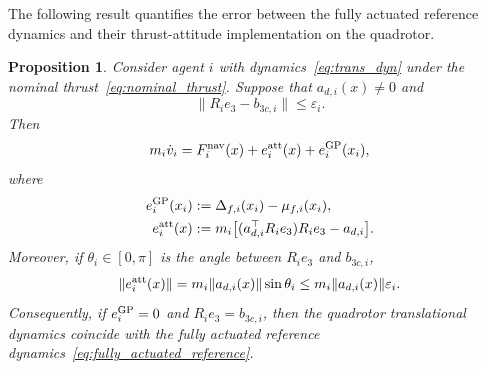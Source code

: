 \documentclass[journal,twoside,web]{ieeecolor}
\newtheorem{proposition}[theorem]{Proposition}
\newtheorem{remark}[theorem]{Remark}
\begin{document}
The following result quantifies the error between the
fully actuated reference dynamics and their thrust-attitude
implementation on the quadrotor.

\begin{proposition}
\label{prop:implementation_error}
Consider agent $i$ with dynamics~\eqref{eq:trans_dyn}
under the nominal thrust~\eqref{eq:nominal_thrust}. Suppose
that $a_{d,i}(x)\neq0$ and
\begin{equation}
    \|R_ie_3-b_{3c,i}\|\leq\varepsilon_i .
    \label{eq:thrust_direction_error}
\end{equation}
Then
\begin{equation}
    m_i\dot v_i
    =
    F_i^{\rm nav}(x)
    +
    e_i^{\rm att}(x)
    +
    e_i^{\rm GP}(x_i),
    \label{eq:implemented_nav_dynamics}
\end{equation}
where
\begin{align}
    e_i^{\rm GP}(x_i)
    &:=
    \Delta_{f,i}(x_i)-\mu_{f,i}(x_i),
    \label{eq:gp_error}
    \\
    e_i^{\rm att}(x)
    &:=
    m_i
    \big[
        (a_{d,i}^{\top}R_ie_3)R_ie_3
        -
        a_{d,i}
    \big].
    \label{eq:att_error}
\end{align} 
Moreover, if \(\theta_i\in[0,\pi]\) is the angle between
\(R_ie_3\) and \(b_{3c,i}\), 
\begin{equation}
    \|e_i^{\rm att}(x)\|
    =
    m_i\|a_{d,i}(x)\|\sin\theta_i
    \leq
    m_i\|a_{d,i}(x)\|\varepsilon_i .
    \label{eq:att_error_bound}
\end{equation}
Consequently, if $e_i^{\rm GP}=0$ and $R_ie_3=b_{3c,i}$,
then the quadrotor translational dynamics coincide with the
fully actuated reference dynamics~\eqref{eq:fully_actuated_reference}.
\end{proposition}
\end{document}
